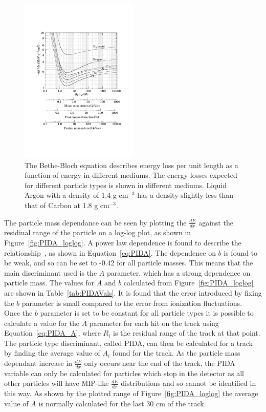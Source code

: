 \begin{figure}[h!]
  \centering
  \includegraphics[width=0.5\textwidth]{BetheBlock}
  \caption[The medium and particle type dependence of the Bethe-Bloch equation]
          {The Bethe-Bloch equation describes energy loss per unit length as a function of energy in different mediums. The energy losses expected for different particle types is shown in different mediums. Liquid Argon with a density of 1.4 g cm$^{-3}$ has a density slightly less than that of Carbon at 1.8 g cm$^{-3}$.}
  \label{fig:BetheBloch}
\end{figure}

The particle mass dependance can be seen by plotting the $\frac{dE}{dx}$ against the residiual range of the particle on a log-log plot, as shown in Figure~\ref{fig:PIDA_loglog}. A power law dependence is found to describe the relationship~\citep{PIDA_Paper}, as shown in Equation~\ref{eq:PIDA}. The dependence on $b$ is found to be weak, and so can be set to -0.42 for all particle masses. This means that the main discriminant used is the $A$ parameter, which has a strong dependence on particle mass. The values for $A$ and $b$ calculated from Figure~\ref{fig:PIDA_loglog} are shown in Table~\ref{tab:PIDAVals}. It is found that the error introduced by fixing the $b$ parameter is small compared to the error from ionization fluctuations. \\

Once the $b$ parameter is set to be constant for all particle types it is possible to calculate a value for the $A$ parameter for each hit on the track using Equation~\ref{eq:PIDA_A}, where $R_i$ is the residual range of the track at that point. The particle type discriminant, called PIDA, can then be calculated for a track by finding the average value of $A_i$ found for the track. As the particle mass dependant increase in $\frac{dE}{dx}$ only occurs near the end of the track, the PIDA variable can only be calculated for particles which stop in the detector as all other particles will have MIP-like $\frac{dE}{dx}$ distributions and so cannot be identified in this way. As shown by the plotted range of Figure~\ref{fig:PIDA_loglog} the average value of $A$ is normally calculated for the last 30 cm of the track. \\

